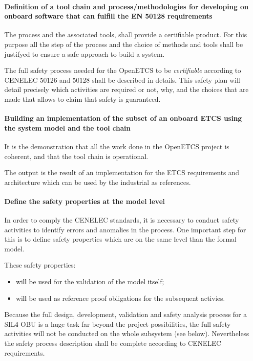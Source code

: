 \paragraph{Definition of a tool chain and process/methodologies for developing 
on onboard software that can fulfill the EN 50128 requirements}


The process and the associated tools, shall provide a certifiable product. For this purpose all the step of the process and the choice of methods and tools shall be justifyed to ensure a safe approach to build a system.

The full safety process needed for the OpenETCS to be \emph{certifiable} according to CENELEC 50126
and 50128 shall be described in details. This safety plan will detail precisely which activities 
are required or not, why, and the choices that are made that allows to claim that safety is guaranteed.


\paragraph{Building an implementation of the subset of an onboard ETCS using the system model and the 
tool chain}

It is the demonstration that all the work done in the OpenETCS project is coherent, and that
the tool chain is operational.

The output is the result of an implementation for the ETCS requirements and architecture which can be used by the industrial as references.

\paragraph{Define the safety properties at the model level}
In order to comply the CENELEC standards, it is necessary to conduct safety activities 
to identify errors and anomalies in the process. One important step for this is to define safety 
properties which are on the same level than the formal model.

These safety properties:
\begin{itemize}
\item will be used for the validation of the model itself;
\item will be used as reference proof obligations for the subsequent activies.
\end{itemize}

Because the full design, development, validation and safety analysis process for a SIL4 OBU
is a huge task far beyond the project possibilities, the full safety activities will not be conducted
on the whole subsystem (see below). Nevertheless the safety process description shall be complete 
according to CENELEC requirements.

